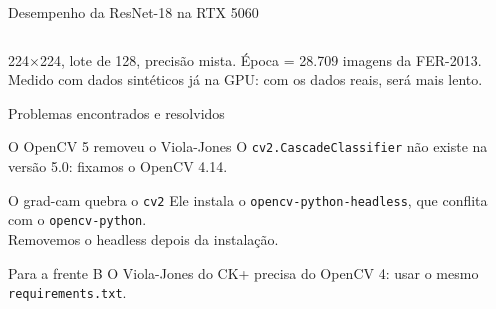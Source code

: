 \documentclass[aspectratio=169,t,xcolor=table]{beamer}
\begin{document}
\begin{frame}{Desempenho da ResNet-18 na RTX 5060}

    \vspace{1.2cm}
    \begin{columns}[c]
          
         \statsep
          
         \statsep
          
    \end{columns}

    \vspace{1.2cm}
    {\footnotesize 224$\times$224, lote de 128, precisão mista. Época = 28.709 imagens da FER-2013.\\
    Medido com dados sintéticos já na GPU: com os dados reais, será mais lento.}

\end{frame}

\begin{frame}{Problemas encontrados e resolvidos}

    \begin{alertblock}{O OpenCV 5 removeu o Viola-Jones}
        O \texttt{cv2.CascadeClassifier} não existe na versão 5.0: fixamos o OpenCV 4.14.
    \end{alertblock}\par
    \begin{alertblock}{O grad-cam quebra o \texttt{cv2}}
        Ele instala o \texttt{opencv-python-headless}, que conflita com o \texttt{opencv-python}.\\
        Removemos o headless depois da instalação.
    \end{alertblock}\par
    \begin{recommendationblock}{Para a frente B}
        O Viola-Jones do CK+ precisa do OpenCV 4: usar o mesmo \texttt{requirements.txt}.
    \end{recommendationblock}\par
    \vspace{\fill}

\end{frame}
\end{document}
